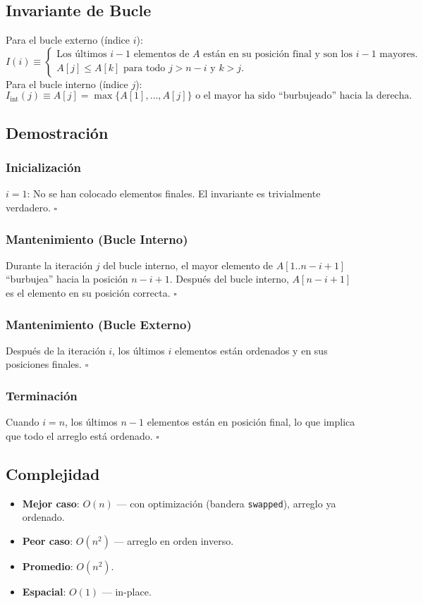 \documentclass[11pt,a4paper]{article}
\newcommand{\inv}{I}
\begin{document}
\subsection{Invariante de Bucle}
Para el bucle externo (índice $i$):
\[
\boxed{\inv(i) \equiv \begin{cases}
\text{Los últimos } i-1 \text{ elementos de } A \text{ están en su posición final y son los } i-1 \text{ mayores.}\\
A[j] \leq A[k] \text{ para todo } j > n-i \text{ y } k > j.
\end{cases}}
\]
Para el bucle interno (índice $j$):
\[
\inv_{\text{int}}(j) \equiv A[j] = \max\{A[1], \ldots, A[j]\} \text{ o el mayor ha sido ``burbujeado'' hacia la derecha.}
\]

\subsection{Demostración}

\subsubsection{Inicialización}
$i = 1$: No se han colocado elementos finales. El invariante es trivialmente verdadero. $\square$

\subsubsection{Mantenimiento (Bucle Interno)}
Durante la iteración $j$ del bucle interno, el mayor elemento de $A[1..n-i+1]$ ``burbujea'' hacia la posición $n-i+1$. Después del bucle interno, $A[n-i+1]$ es el elemento en su posición correcta. $\square$

\subsubsection{Mantenimiento (Bucle Externo)}
Después de la iteración $i$, los últimos $i$ elementos están ordenados y en sus posiciones finales. $\square$

\subsubsection{Terminación}
Cuando $i = n$, los últimos $n-1$ elementos están en posición final, lo que implica que todo el arreglo está ordenado. $\square$

\subsection{Complejidad}
\begin{itemize}
    \item \textbf{Mejor caso}: $O(n)$ --- con optimización (bandera \texttt{swapped}), arreglo ya ordenado.
    \item \textbf{Peor caso}: $O(n^2)$ --- arreglo en orden inverso.
    \item \textbf{Promedio}: $O(n^2)$.
    \item \textbf{Espacial}: $O(1)$ --- in-place.
\end{itemize}
\end{document}
